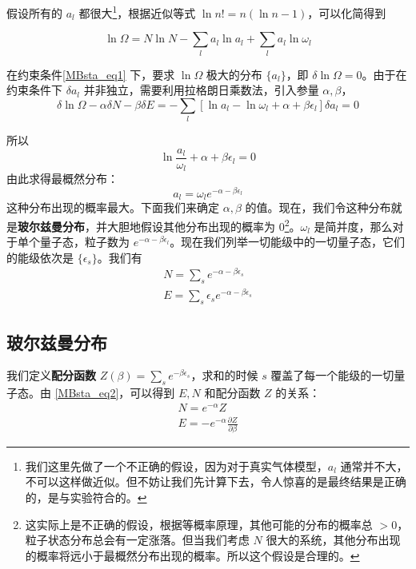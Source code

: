 假设所有的 $a_l$ 都很大\footnote{我们这里先做了一个不正确的假设，因为对于真实气体模型，$a_l$ 通常并不大，不可以这样做近似。但不妨让我们先计算下去，令人惊喜的是最终结果是正确的，是与实验符合的。}，根据近似等式 $\ln n! = n(\ln n-1)$，可以化简得到

\begin{equation}\label{MBsta_eq6}
\ln \Omega=N\ln N-\sum_l a_l\ln a_l+\sum_l a_l\ln \omega_l
\end{equation}

在约束条件\autoref{MBsta_eq1} 下，要求 $\ln \Omega$ 极大的分布 $\{a_l\}$，即 $\delta \ln \Omega =0$。由于在约束条件下 $\delta a_l$ 并非独立，需要利用拉格朗日乘数法，引入参量 $\alpha,\beta$，
\begin{equation}\label{MBsta_eq7}
\delta \ln \Omega -\alpha \delta N-\beta \delta E=-\sum_l [\ln a_l-\ln \omega_l+\alpha +\beta\epsilon_l]\delta a_l=0
\end{equation}

所以
\begin{equation}
\ln \frac{a_l}{\omega_l}+\alpha+\beta\epsilon_l = 0
\end{equation}
由此求得最概然分布：
\begin{equation}\label{MBsta_eq5}
a_l=\omega_l e^{-\alpha -\beta \epsilon_l}
\end{equation}
这种分布出现的概率最大。下面我们来确定 $\alpha,\beta$ 的值。现在，我们令这种分布就是\textbf{玻尔兹曼分布}，并大胆地假设其他分布出现的概率为 $0$\footnote{这实际上是不正确的假设，根据等概率原理，其他可能的分布的概率总 $>0$，粒子状态分布总会有一定涨落。但当我们考虑 $N$ 很大的系统，其他分布出现的概率将远小于最概然分布出现的概率。所以这个假设是合理的。}。$\omega_l$ 是简并度，那么对于单个量子态，粒子数为 $e^{-\alpha-\beta \epsilon_l}$。现在我们列举一切能级中的一切量子态，它们的能级依次是 $\{\epsilon_s\}$。我们有
\begin{equation}\label{MBsta_eq2}
\begin{aligned}
N=\sum_s e^{-\alpha-\beta \epsilon_s}\\
E=\sum_s \epsilon_s e^{-\alpha-\beta \epsilon_s}
\end{aligned}
\end{equation}
\subsection{玻尔兹曼分布}
我们定义\textbf{配分函数} $Z(\beta)=\sum_s e^{-\beta \epsilon_s}$，求和的时候 $s$ 覆盖了每一个能级的一切量子态。由 \autoref{MBsta_eq2}，可以得到 $E,N$ 和配分函数 $Z$ 的关系：
\begin{equation}\label{MBsta_eq3}
\begin{aligned}
N=e^{-\alpha}Z\\
E=-e^{-\alpha}\frac{\partial Z}{\partial \beta}
\end{aligned}
\end{equation}

